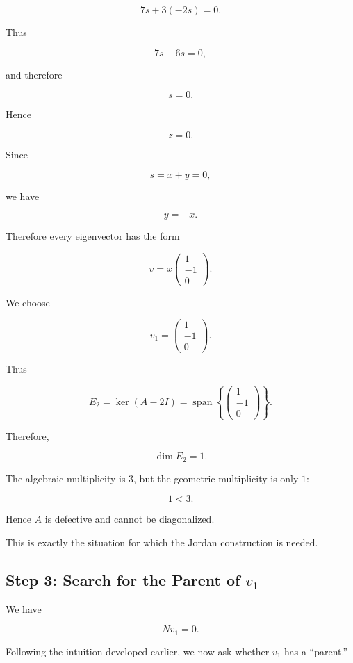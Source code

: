 \documentclass[11pt]{article}
\begin{document}
\[
7s+3(-2s)=0.
\]

Thus

\[
7s-6s=0,
\]

and therefore

\[
s=0.
\]

Hence

\[
z=0.
\]

Since

\[
s=x+y=0,
\]

we have

\[
y=-x.
\]

Therefore every eigenvector has the form

\[
v=
x
\begin{pmatrix}
1\\
-1\\
0
\end{pmatrix}.
\]

We choose

\[
\boxed{
v_1=
\begin{pmatrix}
1\\
-1\\
0
\end{pmatrix}.
}
\]

Thus

\[
\boxed{
E_2
=
\ker(A-2I)
=
\operatorname{span}
\left\{
\begin{pmatrix}
1\\
-1\\
0
\end{pmatrix}
\right\}.
}
\]

Therefore,

\[
\dim E_2=1.
\]

The algebraic multiplicity is \(3\), but the geometric multiplicity is
only \(1\):

\[
\boxed{
1<3.
}
\]

Hence \(A\) is defective and cannot be diagonalized.

This is exactly the situation for which the Jordan construction is
needed.


\subsection{Step 3: Search for the Parent of \(v_1\)}

We have

\[
Nv_1=0.
\]

Following the intuition developed earlier, we now ask whether \(v_1\)
has a ``parent.''
\end{document}
